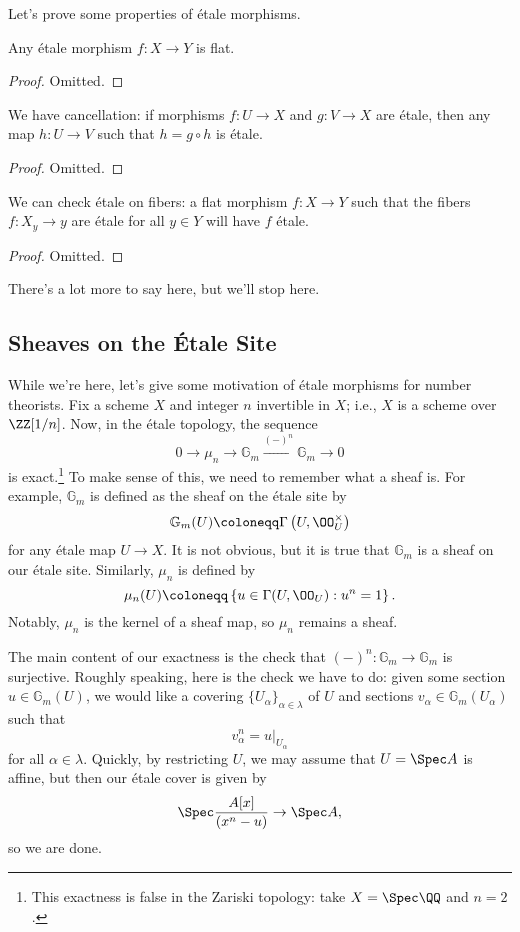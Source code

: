 \documentclass[../notes.tex]{subfiles}
\begin{document}
Let's prove some properties of \'etale morphisms.
\begin{lemma}
	Any \'etale morphism $f\colon X\to Y$ is flat.
\end{lemma}
\begin{proof}
	Omitted.
\end{proof}
\begin{lemma}
	We have cancellation: if morphisms $f\colon U\to X$ and $g\colon V\to X$ are \'etale, then any map $h\colon U\to V$ such that $h=g\circ h$ is \'etale.
\end{lemma}
\begin{proof}
	Omitted.
\end{proof}
\begin{lemma}
	We can check \'etale on fibers: a flat morphism $f\colon X\to Y$ such that the fibers $f\colon X_y\to y$ are \'etale for all $y\in Y$ will have $f$ \'etale.
\end{lemma}
\begin{proof}
	Omitted.
\end{proof}
There's a lot more to say here, but we'll stop here.

\subsection{Sheaves on the \'Etale Site}
While we're here, let's give some motivation of \'etale morphisms for number theorists. Fix a scheme $X$ and integer $n$ invertible in $X$; i.e., $X$ is a scheme over $\ZZ[1/n]$. Now, in the \'etale topology, the sequence
\[0\to\mu_n\to\mathbb G_m\stackrel{(-)^n}\to\mathbb G_m\to0\]
is exact.\footnote{This exactness is false in the Zariski topology: take $X=\Spec\QQ$ and $n=2$.} To make sense of this, we need to remember what a sheaf is. For example, $\mathbb G_m$ is defined as the sheaf on the \'etale site by
\[\mathbb G_m(U)\coloneqq\Gamma\left(U,\OO_U^\times\right)\]
for any \'etale map $U\to X$. It is not obvious, but it is true that $\mathbb G_m$ is a sheaf on our \'etale site. Similarly, $\mu_n$ is defined by
\[\mu_n(U)\coloneqq\left\{u\in\Gamma(U,\OO_U):u^n=1\right\}.\]
Notably, $\mu_n$ is the kernel of a sheaf map, so $\mu_n$ remains a sheaf.

The main content of our exactness is the check that $(-)^n\colon\mathbb G_m\to\mathbb G_m$ is surjective. Roughly speaking, here is the check we have to do: given some section $u\in\mathbb G_m(U)$, we would like a covering $\{U_\alpha\}_{\alpha\in\lambda}$ of $U$ and sections $v_\alpha\in\mathbb G_m(U_\alpha)$ such that
\[v_\alpha^n=u|_{U_\alpha}\]
for all $\alpha\in\lambda$. Quickly, by restricting $U$, we may assume that $U=\Spec A$ is affine, but then our \'etale cover is given by
\[\Spec\frac{A[x]}{\left(x^n-u\right)}\to\Spec A,\]
so we are done.
\end{document}
